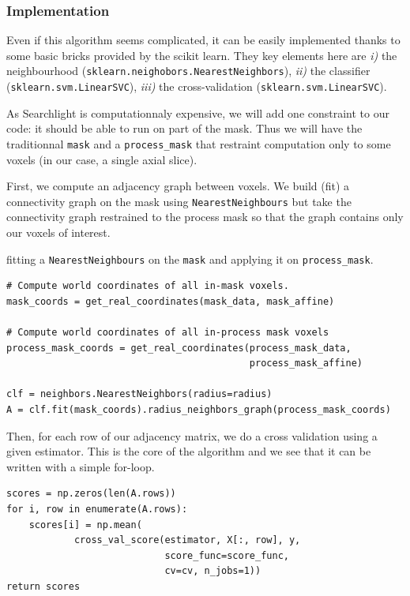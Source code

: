 \documentclass{frontiersSCNS} %
\begin{document}
\subsubsection{Implementation}

Even if this algorithm seems complicated, it can be easily implemented thanks to
some basic bricks provided by the scikit learn. They key elements here are
\textit{i)} the neighbourhood (\verb!sklearn.neighobors.NearestNeighbors!),
\textit{ii)} the classifier (\verb!sklearn.svm.LinearSVC!),
\textit{iii)} the cross-validation (\verb!sklearn.svm.LinearSVC!).

As Searchlight is computationnaly expensive, we will add one constraint to our
code: it should be able to run on part of the mask. Thus we will have the
traditionnal \verb!mask! and a \verb!process_mask! that restraint computation
only to some voxels (in our case, a single axial slice).

First, we compute an adjacency graph between voxels. 
We build (fit) a connectivity graph on the mask using \texttt{NearestNeighbours}
but take the connectivity graph restrained to the
process mask so that the graph contains only our voxels of interest.

fitting a \verb!NearestNeighbours! on the \verb!mask! and applying it on
\verb!process_mask!.

\begin{lstlisting}
# Compute world coordinates of all in-mask voxels.
mask_coords = get_real_coordinates(mask_data, mask_affine)

# Compute world coordinates of all in-process mask voxels
process_mask_coords = get_real_coordinates(process_mask_data,
                                           process_mask_affine)

clf = neighbors.NearestNeighbors(radius=radius)
A = clf.fit(mask_coords).radius_neighbors_graph(process_mask_coords)
\end{lstlisting}

Then, for each row of our adjacency matrix, we do a cross validation using a
given estimator. This is the core of the algorithm and we see that it can be
written with a simple for-loop.

\begin{lstlisting}
scores = np.zeros(len(A.rows))
for i, row in enumerate(A.rows):
    scores[i] = np.mean(
            cross_val_score(estimator, X[:, row], y,
                            score_func=score_func,
                            cv=cv, n_jobs=1))
return scores
\end{lstlisting}
\end{document}
